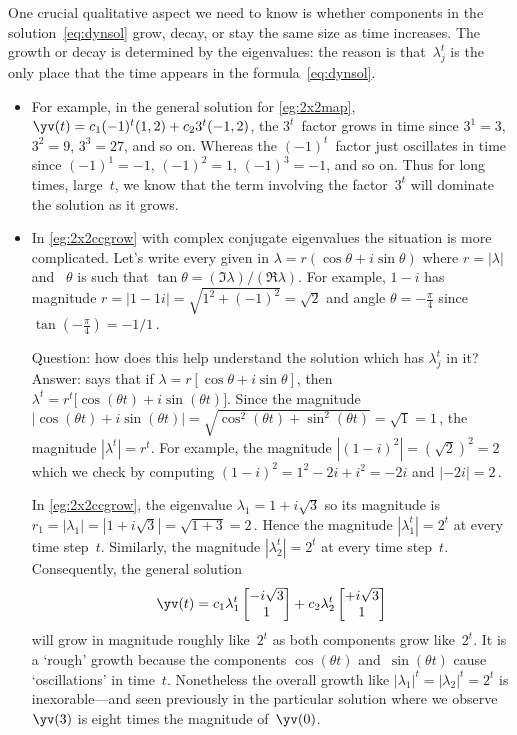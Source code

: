 One crucial qualitative aspect we need to know is whether components in the solution~\eqref{eq:dynsol} grow, decay, or stay the same size as time increases.
The growth or decay is determined by the eigenvalues:
the reason is that~\(\lambda_j^t\) is the only place that the time appears in the formula~\eqref{eq:dynsol}.
\begin{itemize}
\item For example, in the general solution for \autoref{eg:2x2map}, \(\yv(t)=c_1(-1)^t(1,2)+c_23^t(-1,2)\), the \(3^t\)~factor grows in time since \(3^1=3\), \(3^2=9\), \(3^3=27\), and so on.
Whereas the \((-1)^t\)~factor just oscillates in time since \((-1)^1=-1\), \((-1)^2=1\), \((-1)^3=-1\), and so on.
Thus for long times, large~\(t\), we know that the term involving the factor~\(3^t\) will dominate the solution as it grows.

\item In \autoref{eg:2x2ccgrow} with complex conjugate eigenvalues the situation is more complicated.
Let's write every given  in  
\(\lambda=r(\cos\theta+i\sin\theta)\) where  \(r=|\lambda|\) and ~\(\theta\) is such that \(\tan\theta=(\Im\lambda)/(\Re\lambda)\).
For example, \(1-i\) has magnitude \(r=|1-1i|=\sqrt{1^2+(-1)^2}=\sqrt2\) and angle \(\theta=-\frac\pi4\) since \(\tan(-\frac\pi4)=-1/1\)\,.

Question: how does this help understand the solution which has \(\lambda_j^t\) in it?
Answer:  says that if \(\lambda=r[\cos\theta+i\sin\theta]\), then \(\lambda^t=r^t\big[\cos(\theta t)+i\sin(\theta t)\big]\).
Since the magnitude \(|\cos(\theta t)+i\sin(\theta t)|=\sqrt{\cos^2(\theta t)+\sin^2(\theta t)}=\sqrt1=1\)\,, the magnitude \(|\lambda^t|=r^t\).
For example, the magnitude \(|(1-i)^2|=(\sqrt2)^2=2\) which we check by computing \((1-i)^2=1^2-2i+i^2=-2i\) and \(|-2i|=2\)\,.

In \autoref{eg:2x2ccgrow}, the eigenvalue \(\lambda_1=1+i\sqrt3\) so its magnitude is \(r_1=|\lambda_1|=|1+i\sqrt3|=\sqrt{1+3}=2\)\,.
Hence the magnitude \(|\lambda_1^t|=2^t\) at every time step~\(t\).
Similarly, the magnitude \(|\lambda_2^t|=2^t\) at every time step~\(t\).
Consequently, the general solution
\begin{equation*}
\yv(t)=c_1\lambda_1^t\begin{bmatrix} -i\sqrt3\\1 \end{bmatrix}
+c_2\lambda_2^t\begin{bmatrix} +i\sqrt3\\1 \end{bmatrix}
\end{equation*}
will grow in magnitude roughly like~\(2^t\) as both components grow like~\(2^t\).
It is a `rough' growth because the components \(\cos(\theta t)\) and~\(\sin(\theta t)\)  cause `oscillations' in time~\(t\).
Nonetheless the overall growth like \(|\lambda_1|^t=|\lambda_2|^t=2^t\) is inexorable---and seen previously in the particular solution where we observe \(\yv(3)\) is eight times the magnitude of~\(\yv(0)\).
\end{itemize}
